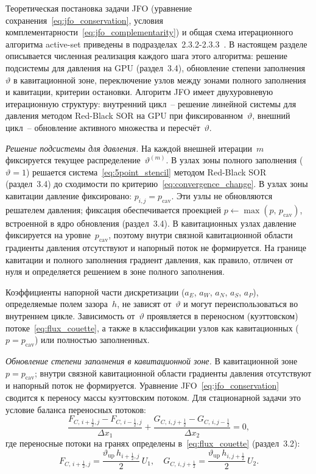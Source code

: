 Теоретическая постановка задачи JFO (уравнение сохранения~\eqref{eq:jfo_conservation}, условия комплементарности~\eqref{eq:jfo_complementarity}) и общая схема итерационного алгоритма active-set приведены в подразделах~2.3.2-2.3.3~\cite{elrod1975}. В настоящем разделе описывается численная реализация каждого шага этого алгоритма: решение подсистемы для давления на GPU (раздел~3.4), обновление степени заполнения~$\vartheta$ в кавитационной зоне, переключение узлов между зонами полного заполнения и кавитации, критерии остановки. Алгоритм JFO имеет двухуровневую итерационную структуру: внутренний цикл~-- решение линейной системы для давления методом Red-Black SOR на GPU при фиксированном~$\vartheta$, внешний цикл~-- обновление активного множества и пересчёт~$\vartheta$.

\textit{Решение подсистемы для давления.}
На каждой внешней итерации~$m$ фиксируется текущее распределение~$\vartheta^{(m)}$. В узлах зоны полного заполнения ($\vartheta = 1$) решается система~\eqref{eq:5point_stencil} методом Red-Black SOR (раздел~3.4) до сходимости по критерию~\eqref{eq:convergence_change}. В узлах зоны кавитации давление фиксировано: $p_{i,j} = p_{\mathrm{cav}}$. Эти узлы не обновляются решателем давления; фиксация обеспечивается проекцией $p \leftarrow \max(p,\, p_{\mathrm{cav}})$, встроенной в ядро обновления (раздел~3.4). В кавитационных узлах давление фиксируется на уровне~$p_{\mathrm{cav}}$, поэтому внутри связной кавитационной области градиенты давления отсутствуют и напорный поток не формируется. На границе кавитации и полного заполнения градиент давления, как правило, отличен от нуля и определяется решением в зоне полного заполнения.

Коэффициенты напорной части дискретизации ($a_E$, $a_W$, $a_N$, $a_S$, $a_P$), определяемые полем зазора~$h$, не зависят от~$\vartheta$ и могут переиспользоваться во внутреннем цикле. Зависимость от~$\vartheta$ проявляется в переносном (куэттовском) потоке~\eqref{eq:flux_couette}, а также в классификации узлов как кавитационных ($p = p_{\mathrm{cav}}$) или полностью заполненных.

\textit{Обновление степени заполнения в кавитационной зоне.}
В кавитационной зоне $p = p_{\mathrm{cav}}$; внутри связной кавитационной области градиенты давления отсутствуют и напорный поток не формируется. Уравнение JFO~\eqref{eq:jfo_conservation} сводится к переносу массы куэттовским потоком. Для стационарной задачи это условие баланса переносных потоков:
\begin{equation}\label{eq:jfo_couette_balance}
  \frac{F_{C,\,i+\frac{1}{2},j} - F_{C,\,i-\frac{1}{2},j}}{\Delta x_1}
  + \frac{G_{C,\,i,j+\frac{1}{2}} - G_{C,\,i,j-\frac{1}{2}}}{\Delta x_2}
  = 0,
\end{equation}
\noindent где переносные потоки на гранях определены в~\eqref{eq:flux_couette} (раздел~3.2):
\begin{equation}\label{eq:jfo_theta_flux}
  F_{C,\,i+\frac{1}{2},j} = \frac{\vartheta_{\mathrm{up}}\,h_{i+\frac{1}{2},j}}{2}\,U_1,
  \quad
  G_{C,\,i,j+\frac{1}{2}} = \frac{\vartheta_{\mathrm{up}}\,h_{i,j+\frac{1}{2}}}{2}\,U_2.
\end{equation}

